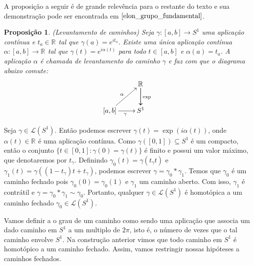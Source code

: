 \documentclass[12pt]{book}
\newtheorem{proposicao}[teorema]{Proposição}
\newcommand{\caminhos}{\mathcal{L}}
\newcommand{\caminhossempontobase}[1]{\caminhos(#1)}
\newcommand{\circulo}{S^{1}}
\newcommand{\intervalo}{[0,1]}
\newcommand{\real}[1]{\mathbb{R}^{#1}}
\newcommand{\reta}{\real{}}
\begin{document}
	A proposição a seguir é de grande relevência para o restante do texto e sua demonstração pode ser encontrada em $\cite{elon_grupo_fundamental}$.
	
	\begin{proposicao}\label{proposicao_levantamento_curvas}
		(Levantamento de caminhos) Seja $\gamma:[a,b] \to S^{1}$ uma aplicação contínua e $t_{a}\in \real{}$ tal que $\gamma(a) = e^{it_{a}}$. Existe uma única aplicação contínua $\alpha:[a,b] \to \real{}$ tal que $\gamma(t) = e^{i\alpha(t)}$ para todo $t\in [a,b]$ e $\alpha(a) = t_{a}$. A aplicação $\alpha$ é chamada de levantamento do caminho $\gamma$ e faz com que o diagrama abaixo comute:
		$$
		\xymatrix{
			& \real{}\ar[d]\ar[d]^{\text{exp}}
			\\
			[a,b]\ar[ur]^{\alpha} \ar[r]_{\gamma} & S^{1}
		}
		$$
	\end{proposicao}
	
	Seja $\gamma \in \caminhossempontobase{\circulo}$. Então podemos escrever $\gamma(t) = \exp(i\alpha(t))$, onde $\alpha(t) \in \reta$ é uma aplicação contínua. Como $\gamma(\intervalo) \subseteq \circulo$ é um compacto, então o conjunto $\{t\in\intervalo: \gamma(0)=\gamma(t) \}$ é finito e possui um valor máximo, que denotaremos por $t_{\gamma} $. Definindo $\gamma_{0}(t) = \gamma(t_{\gamma}t)$ e $\gamma_{1}(t) = \gamma((1-t_{\gamma})t+t_{\gamma})$, podemos escrever $\gamma = \gamma_{0}*\gamma_{1}$. Temos que $\gamma_{0}$ é um caminho fechado pois $\gamma_{0}(0) = \gamma_{0}(1)$ e $\gamma_{1}$ um caminho aberto. Com isso, $\gamma_{1}$ é contrátil e $\gamma = \gamma_{0}*\gamma_{1} \sim \gamma_{0}$. Portanto, qualquer $\gamma \in \caminhos(\circulo)$ é homotópica a um caminho fechado $\gamma_{0} \in \caminhos(\circulo)$.
	
	Vamos definir a o grau de um caminho como sendo uma aplicação que associa um dado caminho em $\circulo$ a um multiplo de $2\pi$, isto é, o número de vezes que o tal caminho envolve $\circulo$. Na construção anterior vimos que todo caminho em $\circulo$ é homotópico a um caminho fechado. Assim, vamos restringir nossas hipóteses a caminhos fechados.
	
\end{document}
